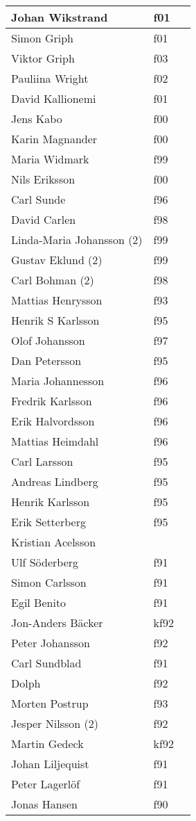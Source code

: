 \begin{longtable}{p{55mm}lp{60mm}}
  Johan Wikstrand & f01 & \\ \hline
  Simon Griph & f01 & \\ \hline
  Viktor Griph & f03 & \\ \hline
  Pauliina Wright & f02 & \\ \hline
  David Kallionemi & f01 & \\ \hline
  Jens Kabo & f00  & \\ \hline
  Karin Magnander & f00 & \\ \hline
  Maria Widmark & f99 & \\ \hline
  Nils Eriksson & f00 & \\ \hline
  Carl Sunde & f96 & \\ \hline
  David Carlen & f98 & \\ \hline
  Linda-Maria Johansson (2) & f99 & \\ \hline
  Gustav Eklund (2) & f99 & \\ \hline
  Carl Bohman (2) & f98 & \\ \hline
  Mattias Henrysson & f93 & \\ \hline
  Henrik S Karlsson & f95 & \\ \hline
  Olof Johansson & f97 & \\ \hline
  Dan Petersson & f95 & \\ \hline
  Maria Johannesson & f96 & \\ \hline
  Fredrik Karlsson & f96 & \\ \hline
  Erik Halvordsson & f96 & \\ \hline
  Mattias Heimdahl & f96 & \\ \hline
  Carl Larsson & f95 & \\ \hline
  Andreas Lindberg & f95 & \\ \hline
  Henrik Karlsson & f95 & \\ \hline
  Erik Setterberg & f95 & \\ \hline
  Kristian Acelsson & & \\ \hline
  Ulf Söderberg & f91 & \\ \hline
  Simon Carlsson & f91 & \\ \hline
  Egil Benito & f91 & \\ \hline
  Jon-Anders Bäcker & kf92 & \\ \hline
  Peter Johansson & f92 & \\ \hline
  Carl Sundblad & f91 & \\ \hline
  Dolph & f92 & \\ \hline
  Morten Postrup & f93 & \\ \hline
  Jesper Nilsson (2) & f92 & \\ \hline
  Martin Gedeck & kf92 & \\ \hline
  Johan Liljequist & f91 & \\ \hline
  Peter Lagerlöf & f91 & \\ \hline
  Jonas Hansen & f90 & \\ \hline

\end{longtable}
